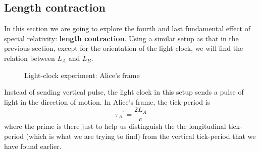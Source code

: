 \documentclass[a4paper,11pt]{article}
\numberwithin{equation}{section}
\begin{document}
 \subsection{Length contraction}
 In this section we are going to explore the fourth and last fundamental effect of special relativity: \textbf{length contraction}. Using a similar setup as that in the previous section, except for the orientation of the light clock, we will find the relation between $L_{A}$ and $L_{B}$.
 \begin{figure}[htb] 
 	\centering
 	\caption{Light-clock experiment: Alice's frame}
 	\label{fig: alice's frame 3}
 \end{figure}
 Instead of sending vertical pulse, the light clock in this setup sends a pulse of light in the direction of motion. In Alice's frame, the tick-period is
 \begin{equation}\label{eq:4.20}
 {\tau_{A}}^{\prime}=\frac{2L_{A}}{c}
 \end{equation}
 \noindent where the prime is there just to help us distinguish the the longitudinal tick-period (which is what we are trying to find) from the vertical tick-period that we have found earlier. 
 
\end{document}
